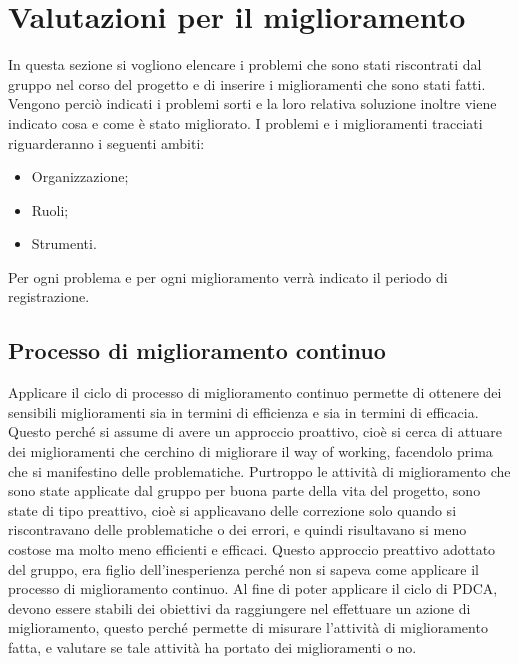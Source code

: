 \clearpage
\section{Valutazioni per il miglioramento}
In questa sezione si vogliono elencare i problemi che sono stati riscontrati dal gruppo nel corso del progetto e di inserire i miglioramenti che sono stati fatti. Vengono perciò indicati i problemi sorti e la loro relativa soluzione inoltre viene indicato cosa e come è stato migliorato.
I problemi e i miglioramenti tracciati riguarderanno i seguenti ambiti:
\begin{itemize}
\item Organizzazione;
\item Ruoli;
\item Strumenti.
\end{itemize}
Per ogni problema e per ogni miglioramento verrà indicato il periodo di registrazione.
\subsection{Processo di miglioramento continuo}
Applicare il ciclo di processo di miglioramento continuo permette di ottenere dei sensibili miglioramenti sia in termini di efficienza e sia in termini di efficacia. Questo perché si assume di avere un approccio proattivo, cioè si cerca di attuare dei miglioramenti che cerchino di migliorare il way of working, facendolo prima che si manifestino delle problematiche. Purtroppo le attività di miglioramento che sono state applicate dal gruppo per buona parte della vita del progetto, sono state di tipo preattivo, cioè si applicavano delle correzione solo quando si riscontravano delle problematiche o dei errori, e quindi risultavano si meno costose ma molto meno efficienti e efficaci. Questo approccio preattivo adottato del gruppo, era figlio dell'inesperienza perché non si sapeva come applicare il processo di miglioramento continuo. Al fine di poter applicare il ciclo di PDCA, devono essere stabili dei obiettivi da raggiungere nel effettuare un azione di miglioramento, questo perché permette di misurare l'attività di miglioramento fatta, e valutare se tale attività ha portato dei miglioramenti o no.
